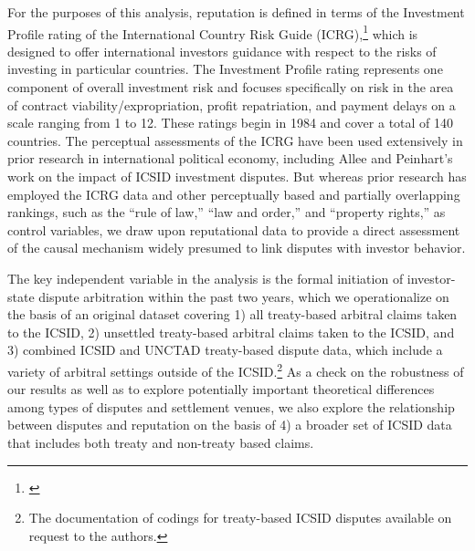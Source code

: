 \documentclass[12pt,onesided]{amsart}
\begin{document}
For the purposes of this analysis, reputation is defined in terms of the Investment Profile rating of the International Country Risk Guide (ICRG),\footnote{\citet{prs:2013}} which is designed to offer international investors guidance with respect to the risks of investing in particular countries. The Investment Profile rating represents one component of overall investment risk and focuses specifically on risk in the area of contract viability/expropriation, profit repatriation, and payment delays on a scale ranging from 1 to 12. These ratings begin in 1984 and cover a total of 140 countries. The perceptual assessments of the ICRG have been used extensively in prior research in international political economy, including Allee and Peinhart's work on the impact of ICSID investment disputes. But whereas prior research has employed the ICRG data and other perceptually based and partially overlapping rankings, such as the ``rule of law,'' ``law and order,'' and ``property rights,'' as control variables, we draw upon reputational data to provide a direct assessment of the causal mechanism widely presumed to link disputes with investor behavior.


The key independent variable in the analysis is the formal initiation of investor-state dispute arbitration within the past two years, which we operationalize on the basis of an original dataset covering 1) all treaty-based arbitral claims taken to the ICSID, 2) unsettled treaty-based arbitral claims taken to the ICSID, and 3) combined ICSID and UNCTAD treaty-based dispute data, which include a variety of arbitral settings outside of the ICSID.\footnote{The documentation of codings for treaty-based ICSID disputes available on request to the authors.} As a check on the robustness of our results as well as to explore potentially important theoretical differences among types of disputes and settlement venues, we also explore the relationship between disputes and reputation on the basis of 4) a broader set of ICSID data that includes both treaty and non-treaty based claims.
\end{document}

